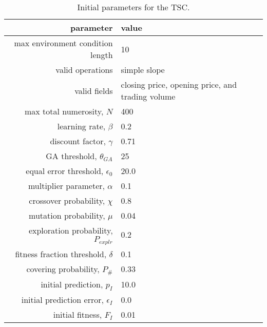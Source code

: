 \begin{table}
\caption{Initial parameters for the TSC.}
\label{tab:initial-parameters}
\begin{tabular}{|r|l|}
   \hline
   \textbf{parameter} & \textbf{value} \\
   \hline
   max environment condition length & 10 \\
   valid operations & simple slope \\
   valid fields & closing price, opening price, and trading volume \\
   max total numerosity, $N$ & 400 \\
   learning rate, $\beta$ & 0.2 \\
   discount factor, $\gamma$ & 0.71 \\
   GA threshold, $\theta_{GA}$ & 25 \\
   equal error threshold, $\epsilon_0$ & 20.0 \\
   multiplier parameter, $\alpha$ & 0.1 \\
   crossover probability, $\chi$ & 0.8 \\
   mutation probability, $\mu$ & 0.04 \\
   exploration probability, $P_{explr}$ & 0.2 \\
   fitness fraction threshold, $\delta$ & 0.1 \\
   covering probability, $P_\#$ & 0.33 \\
   initial prediction, $p_I$ & 10.0 \\
   initial prediction error, $\epsilon_I$ & 0.0 \\
   initial fitness, $F_I$ & 0.01\\
   \hline
\end{tabular}
\end{table}













